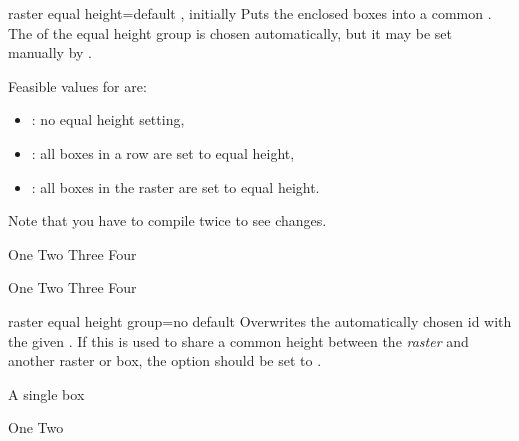\clearpage
\begin{docTcbKey}[][doc new=2014-11-10]{raster equal height}{=}{default , initially }
  Puts the enclosed boxes into a common .
  The  of the equal height group is chosen automatically, but
  it may be set manually by .

  Feasible values for  are:
  \begin{itemize}
  \item{}: no equal height setting,
  \item{}: all boxes in a row are set to equal height,
  \item{}: all boxes in the raster are set to equal height.
  \end{itemize}
  Note that you have to compile twice to see changes.

\begin{dispExample}
\begin{tcbitemize}[raster equal height=rows,
  size=small,colframe=red!50!black,colback=red!10!white]
  \tcbitem One
  \tcbitem \Huge Two
  \tcbitem Three
  \tcbitem Four
\end{tcbitemize}
\end{dispExample}
\begin{dispExample}
\begin{tcbitemize}[raster equal height,
  size=small,colframe=red!50!black,colback=red!10!white]
  \tcbitem One
  \tcbitem \Huge Two
  \tcbitem Three
  \tcbitem Four
\end{tcbitemize}
\end{dispExample}
\end{docTcbKey}


\begin{docTcbKey}[][doc new=2014-11-10]{raster equal height group}{=}{no default}
  Overwrites the automatically chosen id with the given .
  If this is used to share a common height between the \emph{raster} and
  another raster or box, the  option
  should be set to .
\begin{dispExample}
\begin{tcolorbox}[equal height group=raster-manual-id]
  A single box
\end{tcolorbox}
\begin{tcbitemize}[raster equal height,raster equal height group=raster-manual-id]
  \tcbitem One
  \tcbitem \Huge Two
\end{tcbitemize}
\end{dispExample}
\end{docTcbKey}


